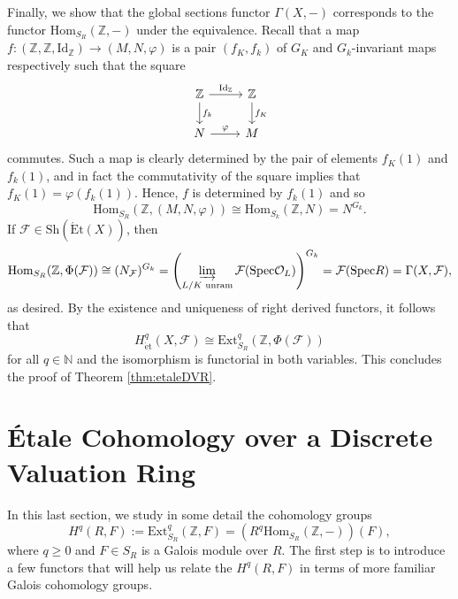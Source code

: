 \documentclass{article}
\newcommand{\Hom}{\mathrm{Hom}}
\newcommand{\Ext}{\mathrm{Ext}}
\newcommand{\Spec}{\mathrm{Spec}}
\newcommand{\Et}{\acute{\mathrm{E}}\mathrm{t}}
\newcommand{\et}{\acute{\mathrm{e}}\mathrm{t}}
\newcommand{\Sh}{\mathrm{Sh}}
\newcommand{\Id}{\mathrm{Id}}
\newcommand{\NN}{\mathbb{N}}
\newcommand{\ZZ}{\mathbb{Z}}
\theoremstyle{plain}
\theoremstyle{definition}
\begin{document}
    Finally, we show that the global sections functor $\Gamma(X,-)$ corresponds to the functor $\Hom_{S_R}(\ZZ,-)$ under the equivalence. Recall that a map $f:(\ZZ,\ZZ,\Id_\ZZ)\to(M,N,\varphi)$ is a pair $(f_K,f_k)$ of $G_K$ and $G_k$-invariant maps respectively such that the square
    \[
        \begin{tikzcd}
            \ZZ \arrow[r,"\Id_\ZZ"] \arrow[d,"f_k"] & \ZZ \arrow[d,"f_K"] \\
            N \arrow[r,"\varphi"] & M
        \end{tikzcd}
    \]
    commutes. Such a map is clearly determined by the pair of elements $f_K(1)$ and $f_k(1)$, and in fact the commutativity of the square implies that $f_K(1)=\varphi(f_k(1))$. Hence, $f$ is determined by $f_k(1)$ and so $$\Hom_{S_R}(\ZZ,(M,N,\varphi))\cong\Hom_{S_k}(\ZZ,N)=N^{G_k}.$$
    If $\mathcal{F}\in\Sh(\Et(X))$, then $$\Hom_{S_R}(\ZZ,\Phi(\mathcal{F}))\cong (N_\mathcal{F})^{G_k}=\left(\varinjlim_{\substack{L/K \text{ unram}}}\mathcal{F}(\Spec\mathcal{O}_L)\right)^{G_k}=\mathcal{F}(\Spec R)=\Gamma(X,\mathcal{F}),$$
    as desired. By the existence and uniqueness of right derived functors, it follows that 
    $$H^q_{\et}(X,\mathcal{F})\cong\Ext_{S_R}^q(\ZZ,\Phi(\mathcal{F}))$$
    for all $q\in\NN$ and the isomorphism is functorial in both variables. This concludes the proof of Theorem \ref{thm:etaleDVR}.

    \section{\'{E}tale Cohomology over a Discrete Valuation Ring}
    In this last section, we study in some detail the cohomology groups
    $$H^q(R,F):=\Ext^q_{S_R}(\ZZ,F)=(R^q\Hom_{S_R}(\ZZ,-))(F),$$
    where $q\geq 0$ and $F\in S_R$ is a Galois module over $R$. The first step is to introduce a few functors that will help us relate the $H^q(R,F)$ in terms of more familiar Galois cohomology groups.
\end{document}
